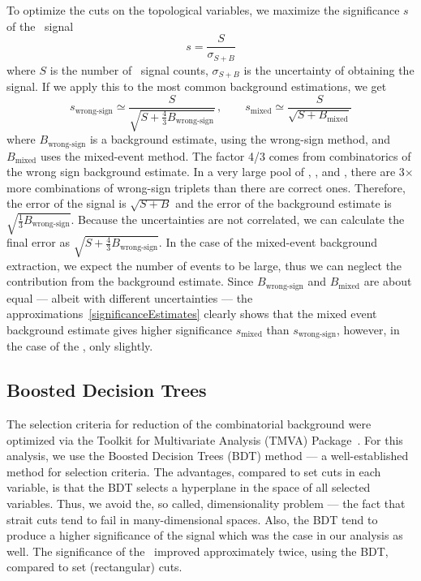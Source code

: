 To optimize the cuts on the topological variables, we maximize the significance $s$ of the \Lambdac\ signal
\begin{equation} \label{significance}
 s = \frac{S}{\sigma_{S+B}}
\end{equation}
where $S$ is the number of \Lambdac\ signal counts, $\sigma_{S+B}$ is the uncertainty of obtaining the signal.
If we apply this to the most common background estimations, we get
\begin{equation} \label{significanceEstimates}
  s_\text{wrong-sign} \simeq \frac{S}{\sqrt{S+\frac{4}{3}B_\text{wrong-sign}}}\,, \qquad
 s_\text{mixed} \simeq \frac{S}{\sqrt{S + B_\text{mixed}}} 
\end{equation}
where $B_\text{wrong-sign}$ is a background estimate, using the wrong-sign method, and $B_\text{mixed}$ uses the mixed-event method. The factor 4/3 comes from combinatorics of the wrong sign background estimate. In a very large pool of \pipm, \Kmp, and \ppm, there are 3$\times$ more combinations of wrong-sign triplets than there are correct ones. Therefore, the error of the signal is $\sqrt{S + B}$ and the error of the background estimate is $\sqrt{\frac{1}{3}B_\text{wrong-sign}}$\@. Because the uncertainties are not correlated, we can calculate the final error as $\sqrt{S+\frac{4}{3}B_\text{wrong-sign}}$\@. In the case of the mixed-event background extraction, we expect the number of events to be large, thus we can neglect the contribution from the background estimate. Since $B_\text{wrong-sign}$ and $B_\text{mixed}$ are about equal --- albeit with different uncertainties --- the approximations~\eqref{significanceEstimates} clearly shows that the mixed event background estimate gives higher significance $s_\text{mixed}$ than $s_\text{wrong-sign}$, however, in the case of the \Lambdac, only slightly.

\subsection{Boosted Decision Trees}

The selection criteria for reduction of the combinatorial background were optimized via the Toolkit for Multivariate Analysis (TMVA) Package~\cite{TMVA}. For this analysis, we use the Boosted Decision Trees (BDT) method --- a well-established method for selection criteria. The advantages, compared to set cuts in each variable, is that the BDT selects a hyperplane in the space of all selected variables. Thus, we avoid the, so called, dimensionality problem --- the fact that strait cuts tend to fail in many-dimensional spaces. Also, the BDT tend to produce a higher significance of the signal which was the case in our analysis as well. The significance of the \Lambdac\ improved approximately twice, using the BDT, compared to set (rectangular) cuts.




